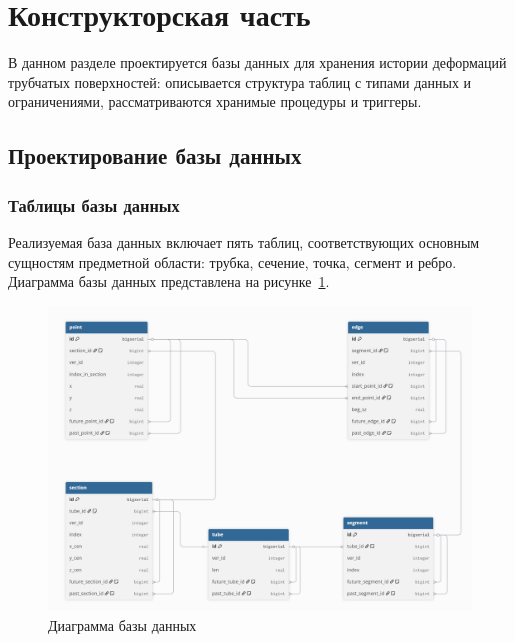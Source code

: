 \section{Конструкторская часть}

\noindent
\hspace{1.25cm}
В данном разделе проектируется базы данных для хранения истории деформаций трубчатых поверхностей: описывается структура таблиц с типами данных и ограничениями, рассматриваются хранимые процедуры и триггеры.

\subsection{Проектирование базы данных}

\subsubsection{Таблицы базы данных}

\noindent
\hspace{1.25cm}
Реализуемая база данных включает пять таблиц, соответствующих основным сущностям предметной области: трубка, сечение, точка, сегмент и ребро. Диаграмма базы данных представлена на рисунке~\ref{fig:db_diagram}.

\begin{figure}[H]
\centering
\includegraphics[width=1.0\textwidth]{img/db_diagram.png}
\caption{Диаграмма базы данных}
\label{fig:db_diagram}
\end{figure}


